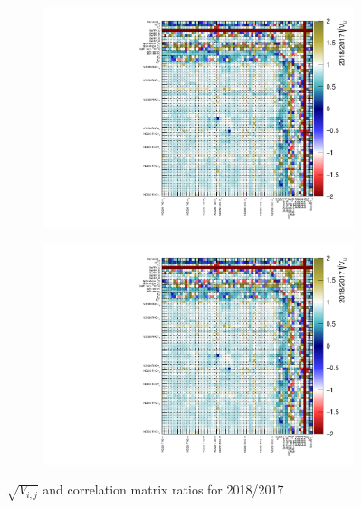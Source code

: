 \begin{figure}[h]
		\begin{subfigure}[t]{0.49\textwidth}
			\includegraphics[width=\textwidth, trim={0mm 0mm 0mm 0mm}, clip,page=1]{figures/mach3/2018/data/2018a_FixedCov_RedCov_Mpi_Data_merge_drawCorr_2017b_NewData_NewDet_UpdXsecStep_2Xsec_4Det_5Flux_0_drawCorr}
		\end{subfigure}
		\begin{subfigure}[t]{0.49\textwidth}
			\includegraphics[width=\textwidth, trim={0mm 0mm 0mm 0mm}, clip,page=2]{figures/mach3/2018/data/2018a_FixedCov_RedCov_Mpi_Data_merge_drawCorr_2017b_NewData_NewDet_UpdXsecStep_2Xsec_4Det_5Flux_0_drawCorr}
		\end{subfigure}
		\caption{$\sqrt{V_{i,j}}$ and correlation matrix ratios for 2018/2017}
	\label{fig:postfit_corr_nd280_rat_2018}
\end{figure}

